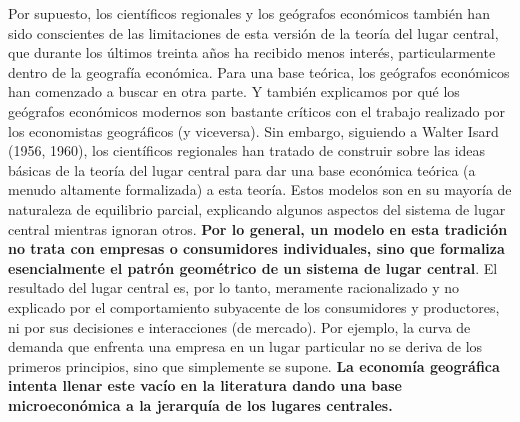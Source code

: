 Por supuesto, los científicos regionales y los geógrafos económicos también han sido conscientes de las limitaciones de esta versión de la teoría del lugar central, que durante los últimos treinta años ha recibido menos interés, particularmente dentro de la geografía económica. Para una base teórica, los geógrafos económicos han comenzado a buscar en otra parte. Y también explicamos por qué los geógrafos económicos modernos son bastante críticos con el trabajo realizado por los economistas geográficos (y viceversa). Sin embargo, siguiendo a Walter Isard (1956, 1960), los científicos regionales han tratado de construir sobre las ideas básicas de la teoría del lugar central para dar una base económica teórica (a menudo altamente formalizada) a esta teoría. Estos modelos son en su mayoría de naturaleza de equilibrio parcial, explicando algunos aspectos del sistema de lugar central mientras ignoran otros. \textbf{Por lo general, un modelo en esta tradición no trata con empresas o consumidores individuales, sino que formaliza esencialmente el patrón geométrico de un sistema de lugar central}. El resultado del lugar central es, por lo tanto, meramente racionalizado y no explicado por el comportamiento subyacente de los consumidores y productores, ni por sus decisiones e interacciones (de mercado). Por ejemplo, la curva de demanda que enfrenta una empresa en un lugar particular no se deriva de los primeros principios, sino que simplemente se supone. \textbf{La economía geográfica intenta llenar este vacío en la literatura dando una base microeconómica a la jerarquía de los lugares centrales.} 

